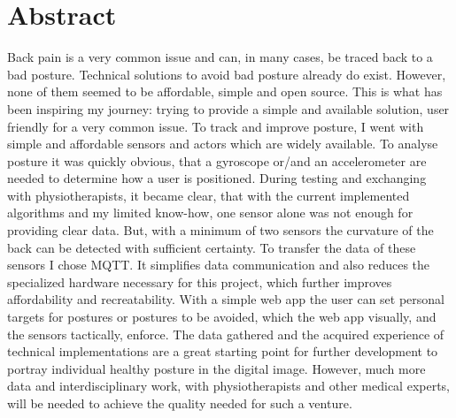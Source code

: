 \chapter*{Abstract}
\label{chap:Abstract}
\renewcommand{\thesection}{\arabic{section}}
\setcounter{section}{0}
Back pain is a very common issue and can, in many cases, be traced back to a bad posture. Technical solutions to avoid bad posture already do exist. However, none of them seemed to be affordable, simple and open source. This is what has been inspiring my journey: trying to provide a simple and available solution, user friendly for a very common issue.\newline
To track and improve posture, I went with simple and affordable sensors and actors which are widely available. To analyse posture it was quickly obvious, that a gyroscope or/and an accelerometer are needed to determine how a user is positioned. During testing and exchanging with physiotherapists, it became clear, that with the current implemented algorithms and my limited know-how, one sensor alone was not enough for providing clear data. But, with a minimum of two sensors the curvature of the back can be detected with sufficient certainty. To transfer the data of these sensors I chose MQTT. It simplifies data communication and also reduces the specialized hardware necessary for this project, which further improves affordability and recreatability. With a simple web app the user can set personal targets for postures or postures to be avoided, which the web app visually, and the sensors tactically, enforce.\newline
The data gathered and the acquired experience of technical implementations are a great starting point for further development to portray individual healthy posture in the digital image. However, much more data and interdisciplinary work, with physiotherapists and other medical experts, will be needed to achieve the quality needed for such a venture.
